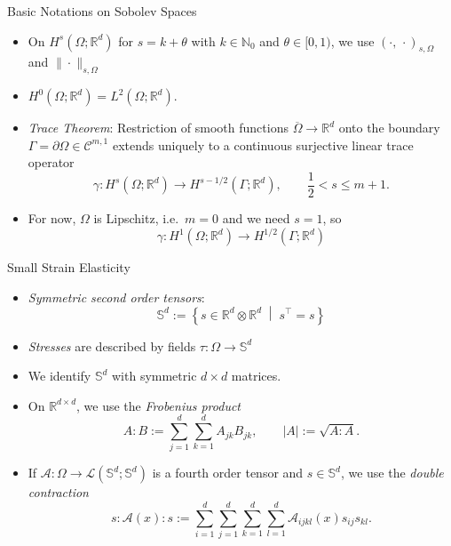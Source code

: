 \documentclass[10pt,aspectratio=169]{beamer}
\def\N{{\mathbb N}}
\def\R{{\mathbb R}}
\def\S{{\mathbb S}}
\def\cA{{\mathcal A}}
\def\cC{{\mathcal C}}
\def\cL{{\mathcal L}}
\begin{document}
\begin{frame}{Basic Notations on Sobolev Spaces}
	\begin{itemize}
		\item On $H^s(\Omega;\R^d)$ for $s =k+\theta$ with $k\in \N_0$ and $\theta\in[0,1)$, we use $(\cdot,\,\cdot)_{s,\Omega}$ and $\|\cdot\|_{s,\Omega}$
		\item $H^0(\Omega;\R^d) = L^2(\Omega;\R^d)$.
		\item {\em Trace Theorem}: Restriction of smooth functions $\overline{\Omega}\to\R^d$ onto the boundary $\Gamma = \partial\Omega\in\cC^{m,1}$ extends uniquely to a continuous surjective linear trace operator
		      \begin{equation*}
			      \gamma: H^s(\Omega;\R^d)\to H^{s-1/2}(\Gamma;\R^d),\qquad \frac{1}{2}<s\le m+1.
		      \end{equation*}
		\item For now, $\Omega$ is Lipschitz, i.e.\ $m=0$ and we need $s = 1$, so
		      \begin{equation*}
			      \gamma: H^1(\Omega;\R^d)\to H^{1/2}(\Gamma;\R^d)
		      \end{equation*}
	\end{itemize}
\end{frame}

\begin{frame}{Small Strain Elasticity}
	\begin{itemize}
		\item {\em Symmetric second order tensors}:
		      \begin{equation*}
			      \S^d:=\left\{s\in\R^d\otimes\R^d\;\middle|\;s^\top = s\right\}
		      \end{equation*}
		\item {\em Stresses} are described by fields $\tau:\Omega\to\S^d$
		\item We identify $\S^d$ with symmetric $d\times d$ matrices.
		\item On $\R^{d\times d}$, we use the {\em Frobenius product}
		      \begin{equation*}
			      A:B := \sum_{j=1}^d\sum_{k=1}^d A_{jk}B_{jk},
			      \qquad
			      |A| := \sqrt{A:A}.
		      \end{equation*}
		\item If $\cA:\Omega\to\cL(\S^d;\S^d)$ is a fourth order tensor and $s\in\S^d$, we use the {\em double contraction}
		      \begin{equation*}
			      s:\cA(x):s:=\sum_{i = 1}^d \sum_{j = 1}^d \sum_{k = 1}^d \sum_{l = 1}^d\cA_{ijkl}(x)s_{ij}s_{kl}.
		      \end{equation*}
	\end{itemize}
\end{frame}
\end{document}
